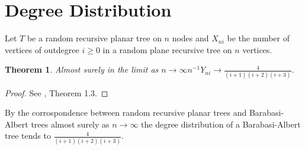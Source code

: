 \documentclass[12pt]{article} %
\newtheorem{thm}{Theorem}[section]
\theoremstyle{definition}
\begin{document}
 
 
 \section{Degree Distribution}

Let $T$ be a random recursive planar tree on $n$ nodes and $X_{ni}$ be the number of vertices of outdegree $i \geq 0$ in a random plane recursive tree on $n$ vertices.

\begin{thm}
 Almost surely in the limit as $n \rightarrow \infty n^{-1}Y_{ni} \rightarrow \frac{4}{(i+1)(i+2)(i+3)}$.  
\end{thm}

 \begin{proof}
  See \cite{}, Theorem 1.3. 
 \end{proof}

 By the corrospondence between random recursive planar trees and Barabasi-Albert trees almost surely as $n \rightarrow \infty$ the degree distribution of a Barabasi-Albert tree tends to $\frac{4}{(i+1)(i+2)(i+3)}$.  
 
 

 
\end{document}
